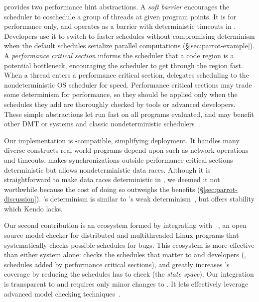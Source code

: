 \parrot provides two performance hint abstractions.  A \emph{soft
  barrier} encourages the scheduler to coschedule a group of threads at
given program points.  It is for performance only, and operates as a
barrier with deterministic timeouts in \parrot.  Developers use it to switch
to faster schedules without compromising determinism
when the default schedules serialize parallel
computations (\S\ref{sec:parrot-example}).  A \emph{performance critical
section}
informs the scheduler that a code region is a potential
bottleneck, encouraging the scheduler to get through the region fast.
When a thread enters a performance critical section, \parrot delegates
scheduling to the
nondeterministic OS scheduler for speed.  
Performance critical sections may trade some determinism for
performance, so they should be applied only when the schedules they add
are thoroughly checked by tools or advanced developers.
These simple abstractions
let \parrot run fast on all programs evaluated, and
may benefit other DMT or \smt systems and classic nondeterministic
schedulers~\cite{coschedule:sigmetrics96, coschedule, partial-barrier:atc06}.


Our \parrot implementation is \pthread-compatible, simplifying deployment.
It handles many diverse constructs real-world programs depend upon such as
network operations and timeouts.  \parrot makes synchronizations outside
performance critical sections deterministic but allows nondeterministic
data races.  Although it is
straightforward to make data races deterministic in \parrot,
we deemed it not worthwhile because the cost of doing so outweighs the
benefits (\S\ref{sec:parrot-discussion}).  \parrot's determinism is similar to
\kendo's weak determinism~\cite{kendo:asplos09}, but \parrot offers stability
which Kendo lacks.


Our second contribution is an ecosystem formed by integrating \parrot with
\dbug~\cite{dbug:spin11}, an open source model checker for 
distributed and multithreaded Linux programs that systematically checks possible
schedules for bugs.
This \ecosys ecosystem is more effective than
either system alone: \dbug checks the schedules
that matter to \parrot and developers (\eg, schedules added by performance
critical sections), and \parrot greatly increases \dbug's coverage by
reducing the schedules \dbug has to check (the \emph{state space}). Our
integration is transparent to \dbug and requires only minor
changes to \parrot.  It lets \parrot effectively leverage advanced model
checking techniques~\cite{flanagan:dynamicpo, demeter:sosp11}.


